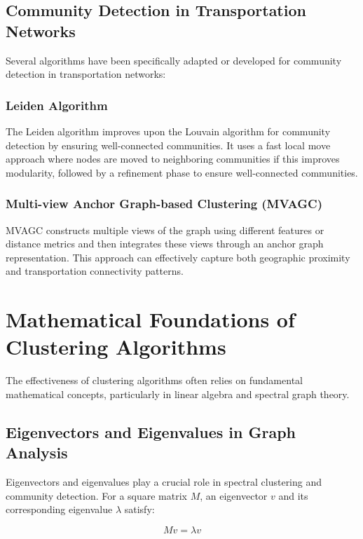 \subsection{Community Detection in Transportation Networks}
\label{subsec:CommunityDetection}

Several algorithms have been specifically adapted or developed for community detection in transportation networks:

\subsubsection{Leiden Algorithm}
The Leiden algorithm improves upon the Louvain algorithm for community detection by ensuring well-connected communities. It uses a fast local move approach where nodes are moved to neighboring communities if this improves modularity, followed by a refinement phase to ensure well-connected communities.

\subsubsection{Multi-view Anchor Graph-based Clustering (MVAGC)}
MVAGC constructs multiple views of the graph using different features or distance metrics and then integrates these views through an anchor graph representation. This approach can effectively capture both geographic proximity and transportation connectivity patterns.

\section{Mathematical Foundations of Clustering Algorithms}
\label{se:MathematicalFoundations}

The effectiveness of clustering algorithms often relies on fundamental mathematical concepts, particularly in linear algebra and spectral graph theory.

\subsection{Eigenvectors and Eigenvalues in Graph Analysis}
\label{subsec:Eigenvectors}

Eigenvectors and eigenvalues play a crucial role in spectral clustering and community detection. For a square matrix $M$, an eigenvector $v$ and its corresponding eigenvalue $\lambda$ satisfy:

\begin{equation}
    M v = \lambda v
\end{equation}

